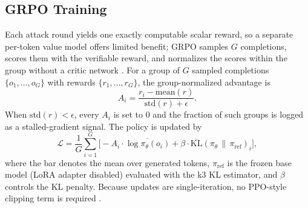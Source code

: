 \documentclass[conference,9pt]{IEEEtran}
\begin{document}
\subsection{GRPO Training}
\label{sec:rl}
Each attack round yields one exactly computable scalar reward, so a separate per-token value model offers limited benefit; GRPO samples $G$ completions, scores them with the verifiable reward, and normalizes the scores within the group without a critic network \cite{grpo}. For a group of $G$ sampled completions $\{o_1,\dots,o_G\}$ with rewards $\{r_1,\dots,r_G\}$, the group-normalized advantage is
\begin{equation}
A_i = \frac{r_i - \mathrm{mean}(r)}{\mathrm{std}(r) + \epsilon}.
\label{eq:advantage}
\end{equation}
When $\mathrm{std}(r) < \epsilon$, every $A_i$ is set to 0 and the fraction of such groups is logged as a stalled-gradient signal. The policy is updated by
\begin{equation}
\mathcal{L} = \frac{1}{G}\sum_{i=1}^{G}\Big[-A_i \cdot \overline{\log \pi_\theta(o_i)} + \beta \cdot \overline{\mathrm{KL}}(\pi_\theta \,\|\, \pi_{\mathrm{ref}})_i\Big],
\label{eq:grpo-loss}
\end{equation}
where the bar denotes the mean over generated tokens, $\pi_{\mathrm{ref}}$ is the frozen base model (LoRA adapter disabled) evaluated with the k3 KL estimator, and $\beta$ controls the KL penalty. Because updates are single-iteration, no PPO-style clipping term is required \cite{schulman2017ppo}.
\end{document}
